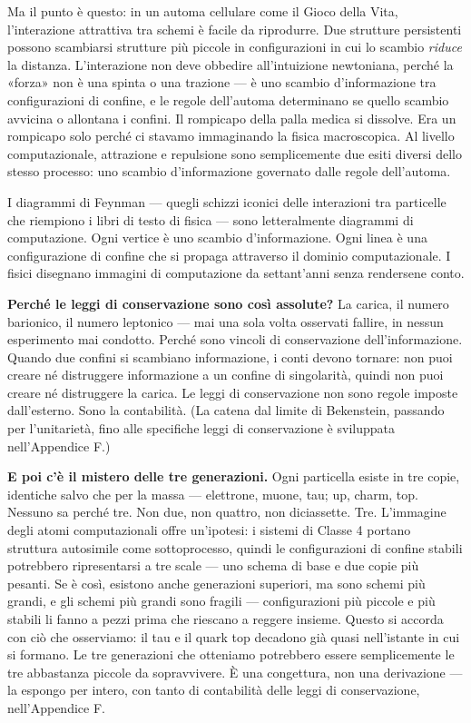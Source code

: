 \documentclass[11pt, twoside, openright]{book}
\begin{document}
Ma il punto è questo: in un automa cellulare come il Gioco della Vita, l'interazione attrattiva tra schemi è facile da riprodurre. Due strutture persistenti possono scambiarsi strutture più piccole in configurazioni in cui lo scambio \textit{riduce} la distanza. L'interazione non deve obbedire all'intuizione newtoniana, perché la «forza» non è una spinta o una trazione --- è uno scambio d'informazione tra configurazioni di confine, e le regole dell'automa determinano se quello scambio avvicina o allontana i confini. Il rompicapo della palla medica si dissolve. Era un rompicapo solo perché ci stavamo immaginando la fisica macroscopica. Al livello computazionale, attrazione e repulsione sono semplicemente due esiti diversi dello stesso processo: uno scambio d'informazione governato dalle regole dell'automa.

I diagrammi di Feynman --- quegli schizzi iconici delle interazioni tra particelle che riempiono i libri di testo di fisica --- sono letteralmente diagrammi di computazione. Ogni vertice è uno scambio d'informazione. Ogni linea è una configurazione di confine che si propaga attraverso il dominio computazionale. I fisici disegnano immagini di computazione da settant'anni senza rendersene conto.

\textbf{Perché le leggi di conservazione sono così assolute?} La carica, il numero barionico, il numero leptonico --- mai una sola volta osservati fallire, in nessun esperimento mai condotto. Perché sono vincoli di conservazione dell'informazione. Quando due confini si scambiano informazione, i conti devono tornare: non puoi creare né distruggere informazione a un confine di singolarità, quindi non puoi creare né distruggere la carica. Le leggi di conservazione non sono regole imposte dall'esterno. Sono la contabilità. (La catena dal limite di Bekenstein, passando per l'unitarietà, fino alle specifiche leggi di conservazione è sviluppata nell'Appendice F.)

\textbf{E poi c'è il mistero delle tre generazioni.} Ogni particella esiste in tre copie, identiche salvo che per la massa --- elettrone, muone, tau; up, charm, top. Nessuno sa perché tre. Non due, non quattro, non diciassette. Tre. L'immagine degli atomi computazionali offre un'ipotesi: i sistemi di Classe 4 portano struttura autosimile come sottoprocesso, quindi le configurazioni di confine stabili potrebbero ripresentarsi a tre scale --- uno schema di base e due copie più pesanti. Se è così, esistono anche generazioni superiori, ma sono schemi più grandi, e gli schemi più grandi sono fragili --- configurazioni più piccole e più stabili li fanno a pezzi prima che riescano a reggere insieme. Questo si accorda con ciò che osserviamo: il tau e il quark top decadono già quasi nell'istante in cui si formano. Le tre generazioni che otteniamo potrebbero essere semplicemente le tre abbastanza piccole da sopravvivere. È una congettura, non una derivazione --- la espongo per intero, con tanto di contabilità delle leggi di conservazione, nell'Appendice F.
\end{document}
